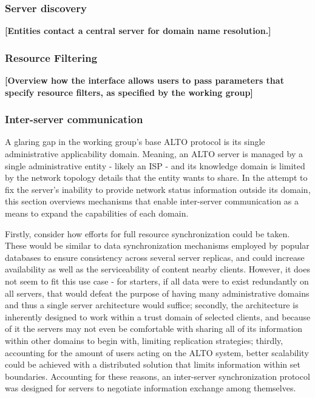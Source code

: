 \subsubsection{Server discovery}

    \textbf{[Entities contact a central server for domain name resolution.]}

\subsubsection{Resource Filtering}

    \textbf{[Overview how the interface allows users to pass parameters that specify resource filters, as specified by the working group]}

\subsubsection{Inter-server communication}
\label{ssec:multi-alto}

    A glaring gap in the working group's base ALTO protocol is its single administrative applicability domain.
    Meaning, an ALTO server is managed by a single administrative entity - likely an ISP - and its knowledge domain is limited by the network topology details that the entity wants to share.
    In the attempt to fix the server's inability to provide network status information outside its domain, this section overviews mechanisms that enable inter-server communication as a means to expand the capabilities of each domain.

    Firstly, consider how efforts for full resource synchronization could be taken.
    These would be similar to data synchronization mechanisms employed by popular databases to ensure consistency across several server replicas, and could increase availability as well as the serviceability of content nearby clients.
    However, it does not seem to fit this use case - for starters, if all data were to exist redundantly on all servers, that would defeat the purpose of having many administrative domains and thus a single server architecture would suffice; secondly, the architecture is inherently designed to work within a trust domain of selected clients, and because of it the servers may not even be comfortable with sharing all of its information within other domains to begin with, limiting replication strategies; thirdly, accounting for the amount of users acting on the ALTO system, better scalability could be achieved with a distributed solution that limits information within set boundaries.
    Accounting for these reasons, an inter-server synchronization protocol was designed for servers to negotiate information exchange among themselves.

